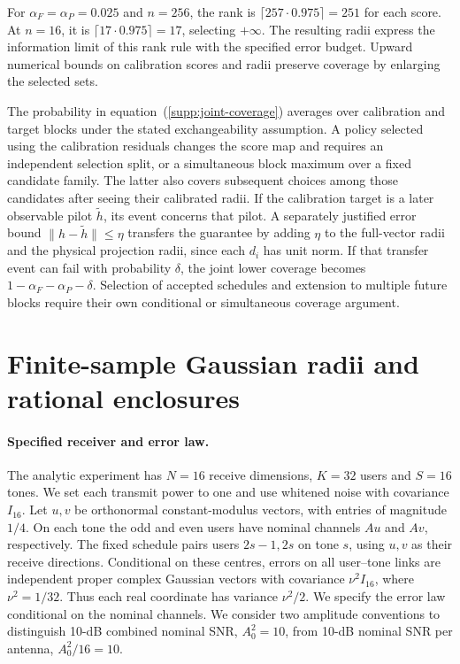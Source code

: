 \documentclass[10pt,letterpaper]{article}
\begin{document}
For $\alpha_F=\alpha_P=0.025$ and $n=256$, the rank is $\lceil257\cdot0.975\rceil=251$ for each score. At $n=16$, it is $\lceil17\cdot0.975\rceil=17$, selecting $+\infty$. The resulting radii express the information limit of this rank rule with the specified error budget. Upward numerical bounds on calibration scores and radii preserve coverage by enlarging the selected sets.

The probability in equation~(\ref{supp:joint-coverage}) averages over calibration and target blocks under the stated exchangeability assumption. A policy selected using the calibration residuals changes the score map and requires an independent selection split, or a simultaneous block maximum over a fixed candidate family. The latter also covers subsequent choices among those candidates after seeing their calibrated radii. If the calibration target is a later observable pilot $\widetilde h$, its event concerns that pilot. A separately justified error bound $\|h-\widetilde h\|\le\eta$ transfers the guarantee by adding $\eta$ to the full-vector radii and the physical projection radii, since each $d_i$ has unit norm. If that transfer event can fail with probability $\delta$, the joint lower coverage becomes $1-\alpha_F-\alpha_P-\delta$. Selection of accepted schedules and extension to multiple future blocks require their own conditional or simultaneous coverage argument.

\FloatBarrier
\section{Finite-sample Gaussian radii and rational enclosures}
\label{supp:note2}

\paragraph{Specified receiver and error law.}
The analytic experiment has \(N=16\) receive dimensions, \(K=32\) users and \(S=16\) tones. We set each transmit power to one and use whitened noise with covariance \(I_{16}\). Let \(u,v\) be orthonormal constant-modulus vectors, with entries of magnitude \(1/4\). On each tone the odd and even users have nominal channels \(Au\) and \(Av\), respectively. The fixed schedule pairs users \(2s-1,2s\) on tone \(s\), using \(u,v\) as their receive directions. Conditional on these centres, errors on all user--tone links are independent proper complex Gaussian vectors with covariance \(\nu^2I_{16}\), where \(\nu^2=1/32\). Thus each real coordinate has variance \(\nu^2/2\). We specify the error law conditional on the nominal channels. We consider two amplitude conventions to distinguish 10-dB combined nominal SNR, \(A_0^2=10\), from 10-dB nominal SNR per antenna, \(A_0^2/16=10\).
\end{document}
